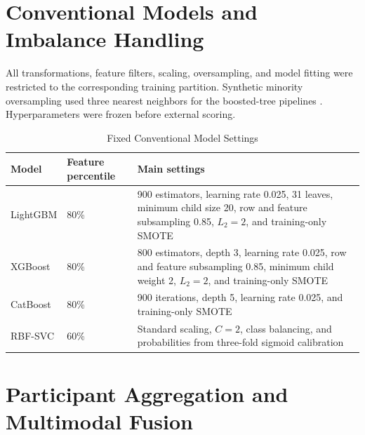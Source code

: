 \documentclass[journal]{IEEEtran}
\begin{document}
\section{Conventional Models and Imbalance Handling}

All transformations, feature filters, scaling, oversampling, and model fitting were restricted to the corresponding training partition. Synthetic minority oversampling used three nearest neighbors for the boosted-tree pipelines \cite{chawla2002smote}. Hyperparameters were frozen before external scoring.

\begin{table}[t]
\caption{Fixed Conventional Model Settings}
\label{tab:s_models}
\centering
\footnotesize
\begin{tabular}{L{2.2cm}L{2.0cm}L{9.3cm}}
\toprule
Model & Feature percentile & Main settings \\
\midrule
LightGBM & 80\% & 900 estimators, learning rate 0.025, 31 leaves, minimum child size 20, row and feature subsampling 0.85, $L_2=2$, and training-only SMOTE \cite{ke2017lightgbm} \\
XGBoost & 80\% & 800 estimators, depth 3, learning rate 0.025, row and feature subsampling 0.85, minimum child weight 2, $L_2=2$, and training-only SMOTE \cite{chen2016xgboost} \\
CatBoost & 80\% & 900 iterations, depth 5, learning rate 0.025, and training-only SMOTE \cite{prokhorenkova2018catboost} \\
RBF-SVC & 60\% & Standard scaling, $C=2$, class balancing, and probabilities from three-fold sigmoid calibration \cite{platt1999probabilistic,niculescu2005calibration} \\
\bottomrule
\end{tabular}
\end{table}

\section{Participant Aggregation and Multimodal Fusion}
\end{document}
